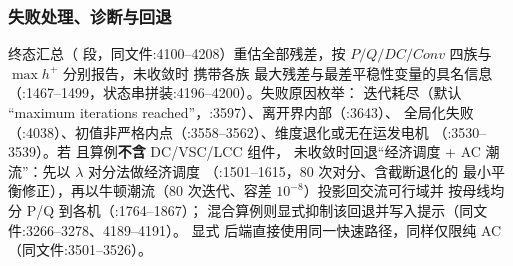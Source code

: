 \subsubsection*{失败处理、诊断与回退}
终态汇总（ 段，同文件:4100--4208）重估全部残差，按
$P/Q/DC/Conv$ 四族与 $\max h^{+}$ 分别报告，未收敛时  携带各族
最大残差与最差平稳性变量的具名信息
（:1467--1499，状态串拼装:4196--4200）。失败原因枚举：
迭代耗尽（默认 ``maximum iterations reached''，:3597）、离开界内部（:3643）、
全局化失败（:4038）、初值非严格内点（:3558--3562）、维度退化或无在运发电机
（:3530--3539）。若  且算例\textbf{不含} DC/VSC/LCC 组件，
未收敛时回退``经济调度 + AC 潮流''：先以 $\lambda$ 对分法做经济调度
（:1501--1615，80 次对分、含截断退化的
最小平衡修正），再以牛顿潮流（80 次迭代、容差 $10^{-8}$）投影回交流可行域并
按母线均分 P/Q 到各机（:1764--1867）；
混合算例则显式抑制该回退并写入提示（同文件:3266--3278、4189--4191）。
显式  后端直接使用同一快速路径，同样仅限纯 AC
（同文件:3501--3526）。

